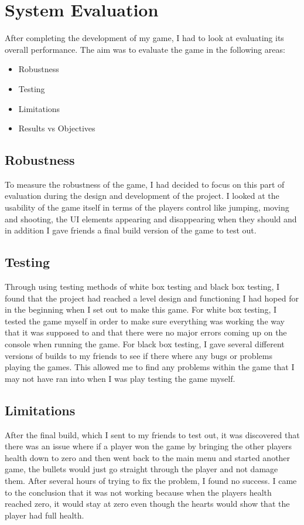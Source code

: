 \chapter{System Evaluation}
After completing the development of my game, I had to look at evaluating its overall performance. The aim was to evaluate the game in the following areas:
\begin{itemize}
\item Robustness
\item Testing
\item Limitations
\item Results vs Objectives
\end{itemize}

\section{Robustness}
To measure the robustness of the game, I had decided to focus on this part of evaluation during the design and development of the project. I looked at the usability of the game itself in terms of the players control like jumping, moving and shooting, the UI elements appearing and disappearing when they should and in addition I gave friends a final build version of the game to test out.

\section{Testing}
Through using testing methods of white box testing and black box testing, I found that the project had reached a level design and functioning I had hoped for in the beginning when I set out to make this game. For white box testing, I tested the game myself in order to make sure everything was working the way that it was supposed to and that there were no major errors coming up on the console when running the game. For black box testing, I gave several different versions of builds to my friends to see if there where any bugs or problems playing the games. This allowed me to find any problems within the game that I may not have ran into when I was play testing the game myself.

\section{Limitations}
After the final build, which I sent to my friends to test out, it was discovered that there was an issue where if a player won the game by bringing the other players health down to zero and then went back to the main menu and started another game, the bullets would just go straight through the player and not damage them. After several hours of trying to fix the problem, I found no success. I came to the conclusion that it was not working because when the players health reached zero, it would stay at zero even though the hearts would show that the player had full health.

